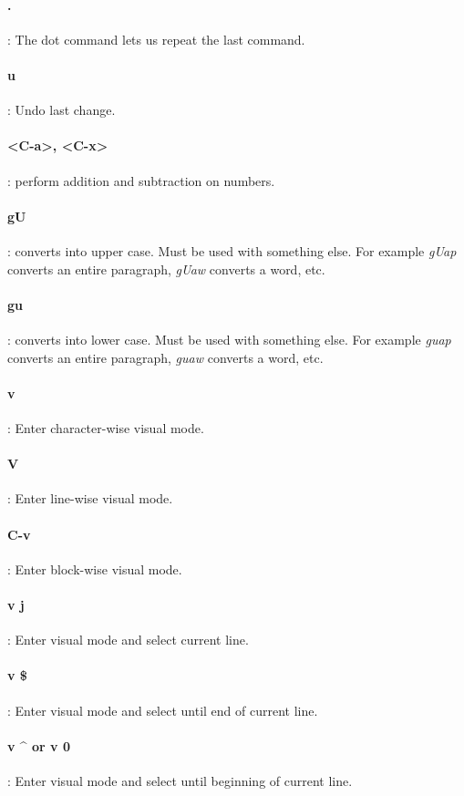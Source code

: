 \documentclass[10pt,letterpaper]{book}
\begin{document}
\paragraph{.}: The dot command lets us repeat the last command.
\paragraph{u}: Undo last change.
\paragraph{<C-a>, <C-x>}: perform addition and subtraction on numbers.
\paragraph{gU}: converts into upper case. Must be used with something else. For example \textit{gUap} converts an entire paragraph, \textit{gUaw} converts a word, etc.
\paragraph{gu}: converts into lower case. Must be used with something else. For example \textit{guap} converts an entire paragraph, \textit{guaw} converts a word, etc.
\paragraph{v}: Enter character-wise visual mode.
\paragraph{V}: Enter line-wise visual mode.
\paragraph{C-v}: Enter block-wise visual mode.

\paragraph{v j}: Enter visual mode and select current line.
\paragraph{v \$ }: Enter visual mode and select until end of current line.
\paragraph{v  \^{} or v 0}: Enter visual mode and select until beginning of current line.
\end{document}
